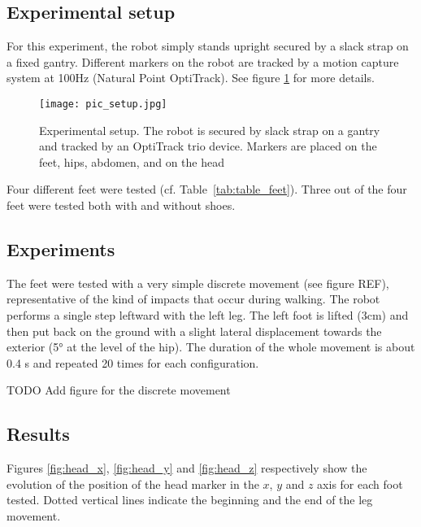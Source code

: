 \subsection{Experimental setup} %
\label{sub:experimental_setup}

For this experiment, the robot simply stands upright secured by a slack strap on a fixed gantry. Different markers on the robot are tracked by a motion capture system at 100Hz (Natural Point OptiTrack). See figure \ref{fig:setup} for more details.

\begin{figure}[ht]
    \begin{center}
        \texttt{[image: pic\_setup.jpg]}
    \end{center}
    \caption{Experimental setup. The robot is secured by slack strap on a gantry and tracked by an OptiTrack trio device. Markers are placed on the feet, hips, abdomen, and on the head}
    \label{fig:setup}
\end{figure}

Four different feet were tested (cf. Table~\ref{tab:table_feet}). Three out of the four feet were tested both with and without shoes.


\subsection{Experiments} %

The feet were tested with a very simple discrete movement (see figure REF), representative of the kind of impacts that occur during walking. The robot performs a single step leftward with the left leg. The left foot is lifted (3cm) and then put back on the ground with a slight lateral displacement towards the exterior (5° at the level of the hip). The duration  of the whole movement is about 0.4 s and repeated 20 times for each configuration.

TODO Add figure for the discrete movement

\subsection{Results} %

Figures \ref{fig:head_x}, \ref{fig:head_y} and \ref{fig:head_z} respectively show the evolution of the position of the head marker in the $x$, $y$ and $z$ axis for each foot tested. Dotted vertical lines indicate the beginning and the end of the leg movement.


